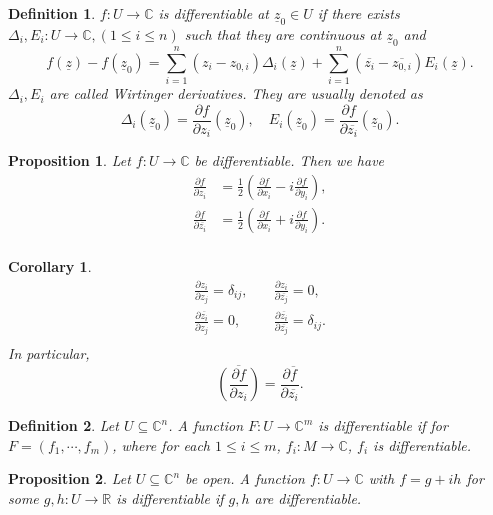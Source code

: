 \documentclass{article}
\newtheorem{proposition}{Proposition}[section]
\newtheorem{definition}{Definition}[section]
\newtheorem{corollary}{Corollary} [section]
\newcommand{\R}[0]{\mathbb{R}}
\newcommand{\C}[0]{\mathbb{C}}
\newcommand{\pd}[2]{{\frac {\partial#1} {\partial#2}}}
\begin{document}
\begin{definition}
$f:U\to\C$ is differentiable at $\underline{z}_0\in U$ if there exists $\Delta_i,E_i:U\to\C,(1\leq i\leq n)$ such that they are continuous at $\underline{z}_0$ and 
\begin{equation*}
f(\underline{z})-f(\underline{z}_0) = \sum_{i=1}^n (z_i-z_{0,i})\Delta_i(\underline{z})+\sum_{i=1}^n (\overline{z_i}-\overline{z_{0,i}})E_i(\underline{z}).
\end{equation*} 
$\Delta_i,E_i$ are called Wirtinger derivatives. They are usually denoted as 
\begin{equation*}
\Delta_i(\underline{z}_0) = \pd{f}{z_i}(\underline{z}_0),\quad E_i(\underline{z}_0) = \pd{f}{\overline{z_i}}(\underline{z}_0).
\end{equation*}
\end{definition}

\begin{proposition}
Let $f:U\to\C$ be differentiable. Then we have
\begin{align*}
\pd{f}{z_i} &= {\frac 1 2}\left(\pd{f}{x_i}-i\pd{f}{y_i}\right),\\
\pd{f}{\overline{z_i}} &= {\frac 1 2}\left(\pd{f}{x_i}+i\pd{f}{y_i}\right).\\
\end{align*}
\end{proposition}

\begin{corollary}
\begin{align*}
\pd{z_i}{z_j} =\delta_{ij},\quad& \pd{z_i}{\overline{z_j}} = 0,\\
\pd{\overline{z_i}}{z_j} =0,\quad& \pd{\overline{z_i}}{\overline{z_j}} = \delta_{ij}.\\
\end{align*}
In particular,
\begin{equation*}
\overline{\left(\pd{f}{z_i}\right)} = \pd{\overline{f}}{\overline{z_i}}.
\end{equation*}
\end{corollary}

\begin{definition}
Let $U\subseteq\C^n$. A function $F:U\to \C^m$ is differentiable if for $F=(f_1,\cdots,f_m)$, where for each $1\leq i\leq m$, $f_i:M\to\C$, $f_i$ is differentiable.
\end{definition}

\begin{proposition}
Let $U\subseteq\C^n$ be open. A function $f:U\to\C$ with $f=g+ih$ for some $g,h:U\to\R$ is differentiable if $g,h$ are differentiable.
\end{proposition}
\end{document}
